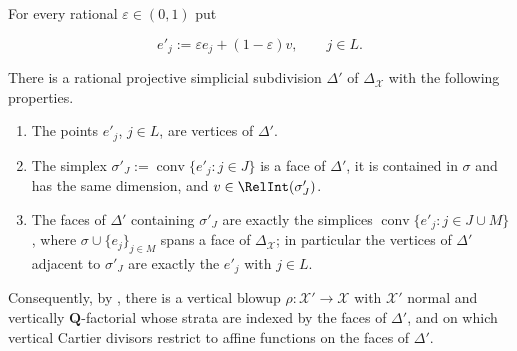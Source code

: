 \begin{lemma}
\label{lem:ch22-star-shrinking}
For every rational \(\varepsilon\in(0,1)\) put

\[
                 e'_j:=\varepsilon e_j+(1-\varepsilon)v,
                 \qquad j\in L .
\tag{22.36}\label{eq:ch22-star-shrink}
\]

There is a rational projective simplicial subdivision \(\Delta'\) of
\(\Delta_{\mathcal X}\) with the following properties.
\begin{enumerate}
\item\label{itm:ch22-star:vertices} The points \(e'_j\), \(j\in L\), are
vertices of \(\Delta'\).
\item\label{itm:ch22-star:face} The simplex
\(\sigma'_J:=\operatorname{conv}\{e'_j:j\in J\}\) is a face of \(\Delta'\),
it is contained in \(\sigma\) and has the same dimension, and
\(v\in\RelInt(\sigma'_J)\).
\item\label{itm:ch22-star:star} The faces of \(\Delta'\) containing
\(\sigma'_J\) are exactly the simplices
\(\operatorname{conv}\{e'_j:j\in J\cup M\}\), where \(\sigma\cup\{e_j\}_{j\in
M}\) spans a face of \(\Delta_{\mathcal X}\); in particular the vertices of
\(\Delta'\) adjacent to \(\sigma'_J\) are exactly the \(e'_j\) with
\(j\in L\).
\end{enumerate}
Consequently, by , there is a vertical blowup
\(\rho:\mathcal X'\to\mathcal X\) with \(\mathcal X'\) normal and vertically
\(\mathbf Q\)-factorial whose strata are indexed by the faces of
\(\Delta'\), and on which vertical Cartier divisors restrict to affine
functions on the faces of \(\Delta'\).
\end{lemma}


